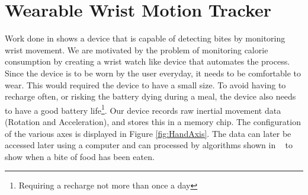 \section{Wearable Wrist Motion Tracker}
\label{Sec:WearbleTracker}
Work done in \cite{drennan2010assessment} shows a device that is capable of detecting bites by monitoring wrist movement.
We are motivated by the problem of monitoring calorie consumption by creating a wrist watch like device that automates the process.
Since the device is to be worn by the user everyday, it needs to be comfortable to wear.
This would required the device to have a small size.
To avoid having to recharge often, or risking the battery dying during a meal,
the device also needs to have a good battery life\footnote{Requiring a recharge not more than once a day}.
Our device records raw inertial movement data (Rotation and Acceleration), and stores this in a memory chip.
The configuration of the various axes is displayed in Figure \ref{fig:HandAxis}.
The data can later be accessed later using a computer and can processed by algorithms shown in
~\cite{dong2012new} to show when a bite of food has been eaten.
